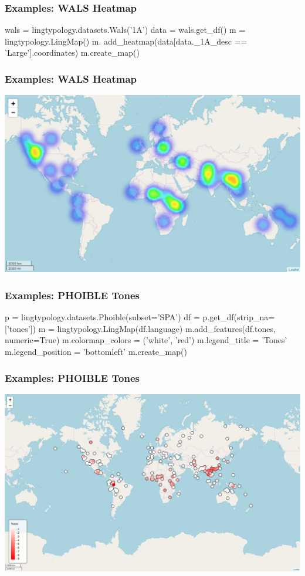 \documentclass{beamer}
\begin{document}
\begin{frame}[fragile]
\frametitle{Examples: WALS Heatmap}
\begin{python}
wals = lingtypology.datasets.Wals('1A')
data = wals.get_df()
m = lingtypology.LingMap()
m. add_heatmap(data[data._1A_desc == 'Large'].coordinates)
m.create_map()
\end{python}
\end{frame}

\begin{frame}
\frametitle{Examples: WALS Heatmap}
\includegraphics[width=\textwidth]{images/WalsHeatMap2.png}
\end{frame}

\begin{frame}[fragile]
\frametitle{Examples: PHOIBLE Tones}
\begin{python}
p = lingtypology.datasets.Phoible(subset='SPA')
df = p.get_df(strip_na=['tones'])
m = lingtypology.LingMap(df.language)
m.add_features(df.tones, numeric=True)
m.colormap_colors = ('white', 'red')
m.legend_title = 'Tones'
m.legend_position = 'bottomleft'
m.create_map()
\end{python}
\end{frame}

\begin{frame}
\frametitle{Examples: PHOIBLE Tones}
\includegraphics[width=\textwidth]{images/PHOIBLE.png}
\end{frame}
\end{document}
